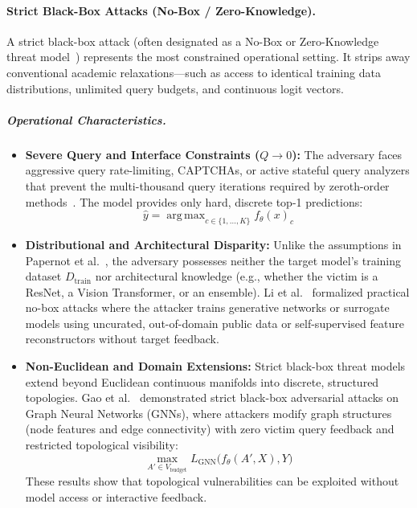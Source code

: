 \documentclass[12pt]{article}
\DeclareMathOperator*{\argmax}{arg\,max}
\begin{document}
\paragraph{Strict Black-Box Attacks (No-Box / Zero-Knowledge).} A strict black-box attack (often designated as a No-Box or Zero-Knowledge threat model~\cite{gao2022,li2020nobox}) represents the most constrained operational setting. It strips away conventional academic relaxations---such as access to identical training data distributions, unlimited query budgets, and continuous logit vectors.

\subparagraph{Operational Characteristics.}
\begin{itemize}
  \item \textbf{Severe Query and Interface Constraints ($Q \to 0$):} The adversary faces aggressive query rate-limiting, CAPTCHAs, or active stateful query analyzers that prevent the multi-thousand query iterations required by zeroth-order methods~\cite{carlini2019,andriushchenko2020}. The model provides only hard, discrete top-1 predictions:
  \begin{equation}
    \hat{y} = \argmax_{c \in \{1, \dots, K\}} f_\theta(x)_c
  \end{equation}
  \item \textbf{Distributional and Architectural Disparity:} Unlike the assumptions in Papernot et al.~\cite{papernot2017}, the adversary possesses neither the target model's training dataset $D_{\mathrm{train}}$ nor architectural knowledge (e.g., whether the victim is a ResNet, a Vision Transformer, or an ensemble). Li et al.~\cite{li2020nobox} formalized practical no-box attacks where the attacker trains generative networks or surrogate models using uncurated, out-of-domain public data or self-supervised feature reconstructors without target feedback.
  \item \textbf{Non-Euclidean and Domain Extensions:} Strict black-box threat models extend beyond Euclidean continuous manifolds into discrete, structured topologies. Gao et al.~\cite{gao2022} demonstrated strict black-box adversarial attacks on Graph Neural Networks (GNNs), where attackers modify graph structures (node features and edge connectivity) with zero victim query feedback and restricted topological visibility:
  \begin{equation}
    \max_{A' \in V_{\mathrm{budget}}} L_{\mathrm{GNN}}\big(f_\theta(A', X), Y\big)
  \end{equation}
  These results show that topological vulnerabilities can be exploited without model access or interactive feedback.
\end{itemize}
\end{document}
